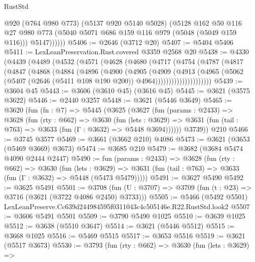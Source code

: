 \begin{lexlean}{RustStd}
\begin{coremodule}
              @920
              (@764 @980 @773)
              (@5137 @920 @5140 @5028)
              (@5128
                @162
                @50
                @116
                @27
                @980
                @773
                (@5040 @5071 @686 @159 @116 @979 (@5048 (@5049 @159 @116)))
                @5147))))))
@5406 := @2646 (@3712 @20)
@5407 := @5404 @5406
@5411 := LexLeanPreservation.Rust.covered @3359 @2568 @20
@5438 := @4330
    (@4439
      (@4489
        (@4532
          (@4571
            (@4628
              (@4680
                (@4717
                  (@4754
                    (@4787
                      (@4817
                        (@4847
                          (@4868
                            (@4884
                              (@4896
                                (@4900
                                  (@4905
                                    (@4909
                                      (@4913
                                        (@4965
                                          (@5062
                                            (@5407
                                              (@2646 (@5411 @108 @190 @200))
                                              @4964)))))))))))))))))))))
@5439 := @3604 @45
@5443 := @3606 (@3610 @45) (@3616 @45)
@5445 := @3621 (@3575 @3622)
@5446 := @2440 @3257
@5448 := @3621 (@5446 @3649)
@5465 := @3620
    (fun (fn : @7) =>
    @5445
      (@3625
        (@3627
          (fun (params : @2433) =>
          @3628
            (fun (rty : @662) =>
            @3630
              (fun (lets : @3629) =>
              @3631 (fun (tail : @763) => @3633 (fun (Γ : @3632) => @5448 @3694))))))
        @3739))
    @210
@5466 := @3745 @3577
@5469 := @3661 (@3662 @210) @4086
@5473 := @3621 (@3653 (@5469 @3669) @3673)
@5474 := @3685 @210
@5479 := @3682 (@3684 @5474 @4090 @2444 @2447)
@5490 := fun (params : @2433) =>
  @3628
    (fun (rty : @662) =>
    @3630
      (fun (lets : @3629) =>
      @3631 (fun (tail : @763) => @3633 (fun (Γ : @3632) => @5448 (@5473 @5479)))))
@5491 := @3627 @5490
@5492 := @3625 @5491
@5501 := @3708 (fun (U : @3707) => @3709 (fun (t : @23) => @3716 (@3621 (@3722 @4086 @2450) @3733)))
@5505 := @5466 (@5492 @5501) LexLeanPreserve.Cc639d244984595f0311043c4c505146e.R22.RustStd.look2
@5507 := @3606 @5491 @5501
@5509 := @3790 @5490 @1025
@5510 := @3639 @1025
@5512 := @3638 (@5510 @3647)
@5514 := @3621 (@5446 @5512)
@5515 := @3668 @1025
@5516 := @5469 @5515
@5517 := @3653 @5516
@5519 := @3621 (@5517 @3673)
@5530 := @3793
    (fun (rty : @662) =>
    @3630
      (fun (lets : @3629) =>

\end{coremodule}
\end{lexlean}
